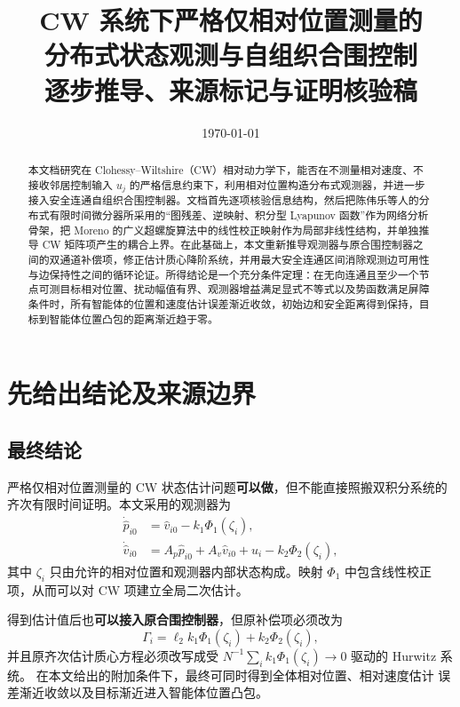 \documentclass[UTF8,a4paper,12pt]{ctexart}
\title{CW 系统下严格仅相对位置测量的\\[0.3em]
分布式状态观测与自组织合围控制\\[0.3em]
逐步推导、来源标记与证明核验稿}
\author{}
\date{\today}
\begin{document}
\maketitle

\begin{abstract}
本文档研究在 Clohessy--Wiltshire（CW）相对动力学下，能否在不测量相对速度、不接收邻居控制输入 $u_j$ 的严格信息约束下，利用相对位置构造分布式观测器，并进一步接入安全连通自组织合围控制器。文档首先逐项核验信息结构，然后把陈伟乐等人的分布式有限时间微分器所采用的“图残差、逆映射、积分型 Lyapunov 函数”作为网络分析骨架，把 Moreno 的广义超螺旋算法中的线性校正映射作为局部非线性结构，并单独推导 CW 矩阵项产生的耦合上界。在此基础上，本文重新推导观测器与原合围控制器之间的双通道补偿项，修正估计质心降阶系统，并用最大安全连通区间消除观测边可用性与边保持性之间的循环论证。所得结论是一个充分条件定理：在无向连通且至少一个节点可测目标相对位置、扰动幅值有界、观测器增益满足显式不等式以及势函数满足屏障条件时，所有智能体的位置和速度估计误差渐近收敛，初始边和安全距离得到保持，目标到智能体位置凸包的距离渐近趋于零。
\end{abstract}

\tableofcontents

\section{先给出结论及来源边界}

\subsection{最终结论}

严格仅相对位置测量的 CW 状态估计问题\textbf{可以做}，但不能直接照搬双积分系统的齐次有限时间证明。本文采用的观测器为
\begin{equation}
\begin{aligned}
  \dot{\hat p}_{i0}
  &=\hat v_{i0}-k_1\Phi_1(\zeta_i),\\
  \dot{\hat v}_{i0}
  &=A_p\hat p_{i0}+A_v\hat v_{i0}+u_i-k_2\Phi_2(\zeta_i),
\end{aligned}
\label{eq:observer-preview}
\end{equation}
其中 $\zeta_i$ 只由允许的相对位置和观测器内部状态构成。映射 $\Phi_1$ 中包含线性校正项，从而可以对 CW 项建立全局二次估计。

得到估计值后也\textbf{可以接入原合围控制器}，但原补偿项必须改为
\begin{equation}
 \Gamma_i=\ell_2k_1\Phi_1(\zeta_i)+k_2\Phi_2(\zeta_i),
\end{equation}
并且原齐次估计质心方程必须改写成受
$N^{-1}\sum_i k_1\Phi_1(\zeta_i)\to0$ 驱动的 Hurwitz 系统。
在本文给出的附加条件下，最终可同时得到全体相对位置、相对速度估计
误差渐近收敛以及目标渐近进入智能体位置凸包。
\end{document}
